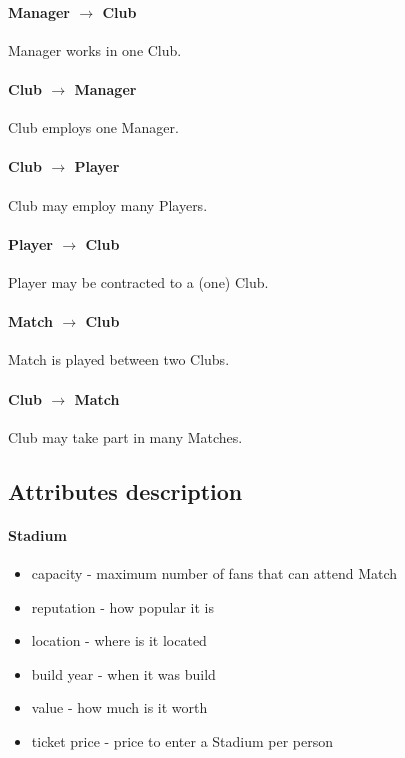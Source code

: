 \documentclass{report}
\begin{document}
\paragraph{Manager $\rightarrow$ Club}
Manager works in one Club.

\paragraph{Club $\rightarrow$ Manager}
Club employs one Manager.

\paragraph{Club $\rightarrow$ Player}
Club may employ many Players.

\paragraph{Player $\rightarrow$ Club}
Player may be contracted to a (one) Club.

\paragraph{Match $\rightarrow$ Club}
Match is played between two Clubs.

\paragraph{Club $\rightarrow$ Match}
Club may take part in many Matches.


\subsection{Attributes description}
\paragraph{Stadium}
\begin{itemize}
    \item capacity - maximum number of fans that can attend Match
    \item reputation - how popular it is
    \item location - where is it located
    \item build year - when it was build
    \item value - how much is it worth
    \item ticket price - price to enter a Stadium per person
\end{itemize}
\end{document}
